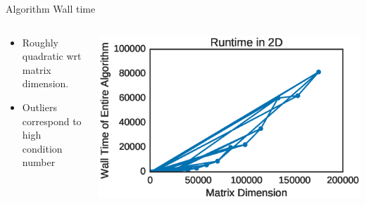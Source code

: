 \documentclass[10pt]{beamer}
\begin{document}
{{{{{{{{{{{{{{{{{{\begin{frame}{Algorithm Wall time}
	\begin{columns}[c] %
		\begin{column}{.4\textwidth}
			\begin{itemize}
				\item {Roughly quadratic wrt matrix dimension.}
				\item {Outliers correspond to high condition number}
			\end{itemize}
		\end{column}
		\hfill
		\begin{column}{0.6\textwidth}
		    \includegraphics[width=\linewidth]{../images/overallruntime.eps}
		\end{column}
	\end{columns}
\end{frame}


}}}}}}}}}}}}}}}}}}
\end{document}
